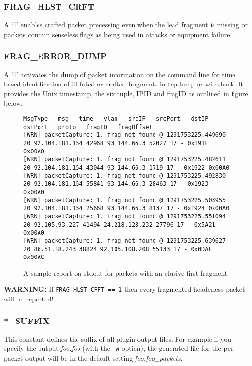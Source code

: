 \subsubsection{FRAG\_HLST\_CRFT}
A `1' enables crafted packet processing even when the lead fragment is missing or packets contain senseless flags as being used in attacks or equipment failure.

\subsubsection{FRAG\_ERROR\_DUMP}
A `1' activates the dump of packet information on the command line for time based identification of ill-fated or crafted fragments in tcpdump or wireshark. It provides the Unix timestamp, the six tuple, IPID and fragID as outlined in figure below.

\begin{figure}[!ht]
\begin{lstlisting}
MsgType   msg   time   vlan   srcIP   srcPort   dstIP   dstPort   proto   fragID   fragOffset
[WRN] packetCapture: 1. frag not found @ 1291753225.449690 20 92.104.181.154 42968 93.144.66.3 52027 17 - 0x191F 0x00A0
[WRN] packetCapture: 1. frag not found @ 1291753225.482611 20 92.104.181.154 43044 93.144.66.3 1719 17 - 0x1922 0x00A0
[WRN] packetCapture: 1. frag not found @ 1291753225.492830 20 92.104.181.154 55841 93.144.66.3 28463 17 - 0x1923 0x00A0
[WRN] packetCapture: 1. frag not found @ 1291753225.503955 20 92.104.181.154 25668 93.144.66.3 8137 17 - 0x1924 0x00A0
[WRN] packetCapture: 1. frag not found @ 1291753225.551094 20 92.105.93.227 41494 24.218.128.232 27796 17 - 0x5A21 0x00A0
[WRN] packetCapture: 1. frag not found @ 1291753225.639627 20 86.51.18.243 38824 92.105.108.208 55133 17 - 0x0DAE 0x00AC
\end{lstlisting}
\caption{A sample report on stdout for packets with an elusive first fragment}
\end{figure}

{\bf WARNING:} If {\tt FRAG\_HLST\_CRFT == 1} then every fragmented headerless packet will be reported!

\subsubsection{*\_SUFFIX}\label{file_suffixes}
This constant defines the suffix of all plugin output files. For example if you specify the output {\em foo.foo} (with the {\tt --w} option), the generated file for the per-packet output will be in the default setting {\em foo.foo\_packets}.

